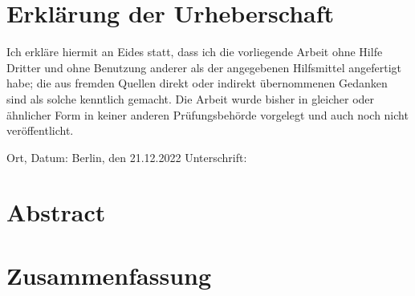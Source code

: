 \chapter*{Erkl{\"a}rung der Urheberschaft}
Ich erkläre hiermit an Eides statt, dass ich die vorliegende Arbeit ohne Hilfe Dritter und ohne Benutzung anderer als der angegebenen Hilfsmittel angefertigt habe; die aus fremden Quellen direkt oder indirekt übernommenen Gedanken sind als solche kenntlich gemacht. Die Arbeit wurde bisher in gleicher oder ähnlicher Form in keiner anderen Prüfungsbehörde vorgelegt und auch noch nicht veröffentlicht.


\vspace{4cm}

Ort, Datum:\hspace{0.25cm} Berlin, den 21.12.2022 \hfill Unterschrift: \hspace{1cm}

\newpage
\chapter*{Abstract}

\newpage
\chapter*{Zusammenfassung}

